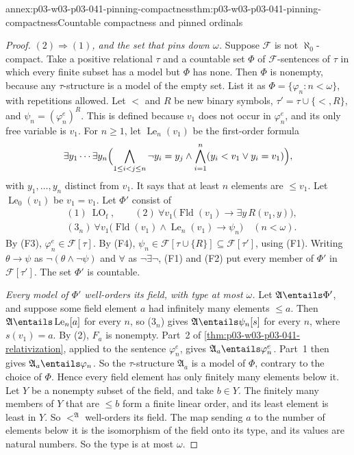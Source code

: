 \begin{annexitem}{annex:p03-w03-p03-041-pinning-compactness}{thm:p03-w03-p03-041-pinning-compactness}{Countable compactness and pinned ordinals}
\begin{proof}
\emph{\((2)\Rightarrow(1)\), and the set that pins down \(\omega\).}
Suppose \(\mathcal F\) is not \(\aleph_0\)-compact. Take a positive
relational \(\tau\) and a countable set \(\Phi\) of
\(\mathcal F\)-sentences of \(\tau\) in which every finite subset has a
model but \(\Phi\) has none. Then \(\Phi\) is nonempty, because any
\(\tau\)-structure is a model of the empty set. List it as
\(\Phi=\{\varphi_n:n<\omega\}\), with repetitions allowed. Let \(<\) and
\(R\) be new binary symbols, \(\tau'=\tau\cup\{<,R\}\), and
\(\psi_n=(\varphi_n^{e})^{R}\). This is defined because \(v_1\) does not
occur in \(\varphi_n^{e}\), and its only free variable is \(v_1\). For
\(n\geq1\), let \(\operatorname{Le}_n(v_1)\) be the first-order formula
\[
 \exists y_1\cdots\exists y_n\Bigl(\bigwedge_{1\leq i<j\leq n}\neg y_i=y_j
   \land\bigwedge_{i=1}^{n}(y_i<v_1\lor y_i=v_1)\Bigr),
\]
with \(y_1,\ldots,y_n\) distinct from \(v_1\). It says that at least \(n\)
elements are \(\leq v_1\). Let \(\operatorname{Le}_0(v_1)\) be
\(v_1=v_1\). Let \(\Phi'\) consist of
\[
\begin{split}
 &(1)\ \operatorname{LO}_{\mathrm f},\qquad
  (2)\ \forall v_1\bigl(\operatorname{Fld}(v_1)\to\exists y\,R(v_1,y)\bigr),\\
 &(3_n)\ \forall v_1\bigl(\operatorname{Fld}(v_1)\land
        \operatorname{Le}_n(v_1)\to\psi_n\bigr)\quad(n<\omega).
\end{split}
\]
By (F3), \(\varphi_n^{e}\in\mathcal F[\tau]\). By (F4),
\(\psi_n\in\mathcal F[\tau\cup\{R\}]\subseteq\mathcal F[\tau']\), using
(F1). Writing \(\theta\to\psi\) as \(\neg(\theta\land\neg\psi)\) and
\(\forall\) as \(\neg\exists\neg\), (F1) and (F2) put every member of
\(\Phi'\) in \(\mathcal F[\tau']\). The set \(\Phi'\) is countable.

\emph{Every model of \(\Phi'\) well-orders its field, with type at most
\(\omega\).} Let \(\mathfrak A\entails\Phi'\), and suppose some field
element \(a\) had infinitely many elements \(\leq a\). Then
\(\mathfrak A\entails\operatorname{Le}_n[a]\) for every \(n\), so (3\(_n\))
gives \(\mathfrak A\entails\psi_n[s]\) for every \(n\), where
\(s(v_1)=a\). By (2), \(F_a\) is nonempty. Part~2 of
\cref{thm:p03-w03-p03-041-relativization}, applied to the sentence
\(\varphi_n^{e}\), gives \(\mathfrak A_a\entails\varphi_n^{e}\). Part~1
then gives \(\mathfrak A_a\entails\varphi_n\). So the \(\tau\)-structure
\(\mathfrak A_a\) is a model of \(\Phi\), contrary to the choice of
\(\Phi\). Hence every field element has only finitely many elements below
it. Let \(Y\) be a nonempty subset of the field, and take \(b\in Y\). The
finitely many members of \(Y\) that are \(\leq b\) form a finite linear
order, and its least element is least in \(Y\). So \(<^{\mathfrak A}\)
well-orders its field. The map sending \(a\) to the number of elements
below it is the isomorphism of the field onto its type, and its values are
natural numbers. So the type is at most \(\omega\).


\end{proof}
\end{annexitem}
